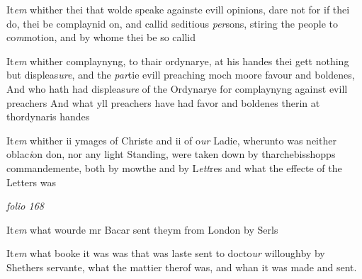 \documentclass[12pt, a4paper]{book}
\begin{document}
            		
            				
				\marginpar[\vspace{0.5cm}{\textcolor{Gray}{10}}]{}
			
            			
            				
		\ifthenelse{\isodd{\thepage}}
		{\reversemarginpar}
		{\normalmarginpar}
		It\textit{em} whither thei that wolde speake againste evill opinions, dare not for if thei do, thei be complaynid on, and callid seditious \textit{per}sons, stiring the people to co\textit{m}motion, and by whome thei be so callid
            			
            		
            					
				\marginpar[\vspace{0.5cm}{\textcolor{Gray}{11}}]{}
			
            					
		\ifthenelse{\isodd{\thepage}}
		{\reversemarginpar}
		{\normalmarginpar}
		It\textit{em} whither complaynyng, to thair ordynarye, at his handes thei gett nothing but displeas\textit{ure}, and the \textit{par}tie evill preaching moch moore favour and boldenes, And who hath had displeas\textit{ure} of the  Ordynarye for complaynyng against evill preachers And what  yll preachers have had favor and boldenes therin at thordynaris handes
			
            		
            			
				\marginpar[\vspace{0.5cm}{\textcolor{Gray}{12}}]{}
			
            			
		\ifthenelse{\isodd{\thepage}}
		{\reversemarginpar}
		{\normalmarginpar}
		It\textit{em} whither ii ymages of Christe and ii of o\textit{ur} Ladie, wherunto was neither oblac\textit{i}on don, nor any light Standing, were taken down by tharchebisshopps commandemente, both by mowthe and by L\textit{ett}res and what the effecte of the Letters was

\dotfill
					

\textit{folio 168}


 	
		\ifthenelse{\isodd{\thepage}}
		{\reversemarginpar}
		{\normalmarginpar}
		It\textit{em} what wourde mr Bacar sent theym from London by Serls
 	
		\ifthenelse{\isodd{\thepage}}
		{\reversemarginpar}
		{\normalmarginpar}
		It\textit{em} what booke
			 it was was that was laste sent to docto\textit{ur} willoughby by Shethers servante, what the mattier therof was, and whan it was made and sent.
 	
\end{document}
